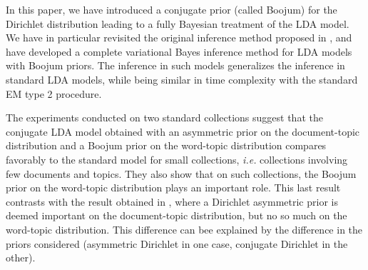 In this paper, we have introduced a conjugate prior (called Boojum) for the Dirichlet distribution leading to a fully Bayesian treatment of the LDA model. We have in particular revisited the original inference method proposed in \cite{blei_latent_2003}, and have developed a complete variational Bayes inference method for LDA models with Boojum priors. The inference in such models generalizes the inference in standard LDA models, while being similar in time complexity with the standard EM type 2 procedure.

The experiments conducted on two standard collections suggest that the conjugate LDA model obtained with an asymmetric prior on the document-topic distribution and a Boojum prior on the word-topic distribution compares favorably to the standard model for small collections, {\it i.e.} collections involving few documents and topics. They also show that on such collections, the Boojum prior on the word-topic distribution plays an important role. This last result contrasts with the result obtained in \cite{wallach_rethinking_2009}, where a Dirichlet  asymmetric prior is deemed important on the document-topic distribution, but no so much on the word-topic distribution. This difference can bee explained by the difference in the priors considered (asymmetric Dirichlet in one case, conjugate Dirichlet in the other).
 